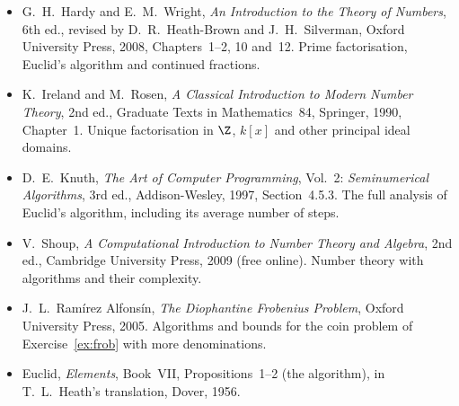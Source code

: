 \begin{itemize}
\item G.~H.~Hardy and E.~M.~Wright, \emph{An Introduction to the Theory of Numbers}, 6th ed., revised by D.~R.~Heath-Brown and J.~H.~Silverman, Oxford University Press, 2008, Chapters~1--2, 10 and~12. Prime factorisation, Euclid's algorithm and continued fractions.
\item K.~Ireland and M.~Rosen, \emph{A Classical Introduction to Modern Number Theory}, 2nd ed., Graduate Texts in Mathematics~84, Springer, 1990, Chapter~1. Unique factorisation in $\Z$, $k[x]$ and other principal ideal domains.
\item D.~E.~Knuth, \emph{The Art of Computer Programming}, Vol.~2: \emph{Seminumerical Algorithms}, 3rd ed., Addison-Wesley, 1997, Section~4.5.3. The full analysis of Euclid's algorithm, including its average number of steps.
\item V.~Shoup, \emph{A Computational Introduction to Number Theory and Algebra}, 2nd ed., Cambridge University Press, 2009 (free online). Number theory with algorithms and their complexity.
\item J.~L.~Ram\'irez Alfons\'in, \emph{The Diophantine Frobenius Problem}, Oxford University Press, 2005. Algorithms and bounds for the coin problem of Exercise~\ref{ex:frob} with more denominations.
\item Euclid, \emph{Elements}, Book~VII, Propositions~1--2 (the algorithm), in T.~L.~Heath's translation, Dover, 1956.
\end{itemize}
